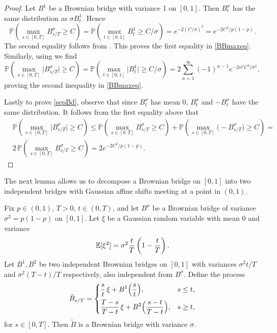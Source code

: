 \begin{proof}
	Let $B^1$ be a Brownian bridge with variance 1 on $[0,1]$. Then $B^\sigma_t$ has the same distribution as $\sigma B^1_t$. Hence
	\begin{equation*}
	\mathbb{P}\left( \max_{s\in[0,T]} B^\sigma_{s/T} \geq C \right) = \mathbb{P}\left( \max_{t\in[0,1]} B^1_t \geq C/\sigma \right) = e^{-2(C/\sigma)^2} = e^{-2C^2/p(1-p)}.
	\end{equation*}
	The second equality follows from \cite[Proposition 12.3.3]{Dudley}. This proves the first equality in \eqref{BBmaxeq}. Similarly, using \cite[Proposition 12.3.4]{Dudley} we find
	\begin{equation*}
	\mathbb{P}\left( \max_{s\in[0,T]} \big| B^\sigma_{s/T}\big| \geq C \right) = \mathbb{P}\left( \max_{t\in[0,1]} \big| B^1_t\big| \geq C/\sigma \right) = 2\sum_{n=1}^\infty (-1)^{n-1}e^{-2n^2C^2/\sigma^2},
	\end{equation*}
	proving the second inequality in \eqref{BBmaxeq}.
	
	Lastly to prove \eqref{sepBd}, observe that since $B^\sigma_t$ has mean 0, $B^\sigma_t$ and $-B^\sigma_t$ have the same distribution. It follows from the first equality above that
	\begin{equation*}
	\begin{split}
	&\mathbb{P}\left( \max_{s\in[0,T]} \big| B^\sigma_{s/T}\big| \geq C \right) \leq \mathbb{P}\left( \max_{s\in[0,T]}  B^\sigma_{s/T} \geq C \right) + \mathbb{P}\left( \max_{s\in[0,T]}  \big(-B^\sigma_{s/T}\big) \geq C \right) = \\
	&2\,\mathbb{P}\left( \max_{s\in[0,T]}  B^\sigma_{s/T} \geq C \right) = 2e^{-2C^2/p(1-p)}.
	\end{split}
	\end{equation*}
\end{proof}

The next lemma allows us to decompose a Brownian bridge on $[0,1]$ into two independent bridges with Gaussian affine shifts meeting at a point in $(0,1)$.

\begin{lemma}\label{2bridges}
	Fix $p\in (0,1)$, $T>0$, $t\in(0,T)$, and let $B^\sigma$ be a Brownian bridge of variance $\sigma^2 = p(1-p)$ on $[0,1]$. Let $\xi$ be a Gaussian random variable with mean 0 and variance
	\[
	\mathbb{E}[\xi^2] = \sigma^2\frac{t}{T}\left(1-\frac{t}{T}\right).
	\]
	Let $B^1,B^2$ be two independent Brownian bridges on $[0,1]$ with variances $\sigma^2 t/T$ and $\sigma^2(T-t)/T$ respectively, also independent from $B^\sigma$. Define the process
	\[
	\tilde{B}_{s/T} = \begin{dcases}
	\frac{s}{t}\,\xi + B^1\Big(\frac{s}{t}\Big), & s\leq t,\\
	\frac{T-s}{T-t}\,\xi + B^2\Big(\frac{s-t}{T-t}\Big), & s\geq t,
	\end{dcases}
	\]
	for $s\in [0,T]$. Then $\tilde{B}$ is a Brownian bridge with variance $\sigma$.
\end{lemma}

